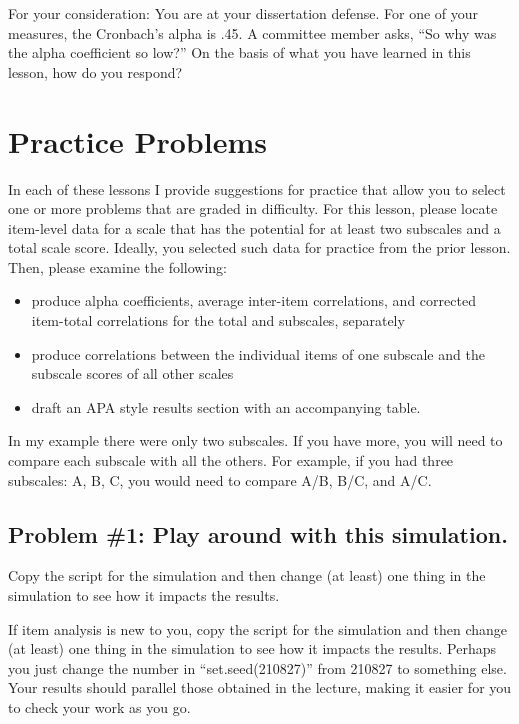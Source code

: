 \documentclass[
  english,
]{book}
\providecommand{\tightlist}{%
  \setlength{\itemsep}{0pt}\setlength{\parskip}{0pt}}
\begin{document}
For your consideration:
You are at your dissertation defense. For one of your measures, the Cronbach's alpha is .45. A committee member asks, ``So why was the alpha coefficient so low?'' On the basis of what you have learned in this lesson, how do you respond?

\hypertarget{practice-problems-5}{%
\section{Practice Problems}\label{practice-problems-5}}

In each of these lessons I provide suggestions for practice that allow you to select one or more problems that are graded in difficulty. For this lesson, please locate item-level data for a scale that has the potential for at least two subscales and a total scale score. Ideally, you selected such data for practice from the prior lesson. Then, please examine the following:

\begin{itemize}
\tightlist
\item
  produce alpha coefficients, average inter-item correlations, and corrected item-total correlations for the total and subscales, separately
\item
  produce correlations between the individual items of one subscale and the subscale scores of all other scales
\item
  draft an APA style results section with an accompanying table.
\end{itemize}

In my example there were only two subscales. If you have more, you will need to compare each subscale with all the others. For example, if you had three subscales: A, B, C, you would need to compare A/B, B/C, and A/C.

\hypertarget{problem-1-play-around-with-this-simulation.-2}{%
\subsection{Problem \#1: Play around with this simulation.}\label{problem-1-play-around-with-this-simulation.-2}}

Copy the script for the simulation and then change (at least) one thing in the simulation to see how it impacts the results.

If item analysis is new to you, copy the script for the simulation and then change (at least) one thing in the simulation to see how it impacts the results. Perhaps you just change the number in ``set.seed(210827)'' from 210827 to something else. Your results should parallel those obtained in the lecture, making it easier for you to check your work as you go.
\end{document}
